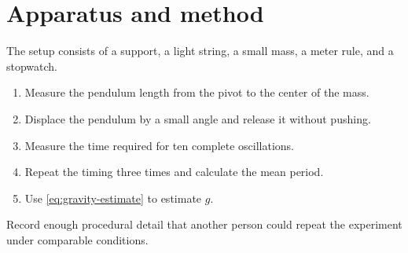 \section{Apparatus and method}

The setup consists of a support, a light string, a small mass, a meter rule,
and a stopwatch.

\begin{enumerate}
  \item Measure the pendulum length from the pivot to the center of the mass.
  \item Displace the pendulum by a small angle and release it without pushing.
  \item Measure the time required for ten complete oscillations.
  \item Repeat the timing three times and calculate the mean period.
  \item Use \autoref{eq:gravity-estimate} to estimate $g$.
\end{enumerate}

Record enough procedural detail that another person could repeat the
experiment under comparable conditions.
